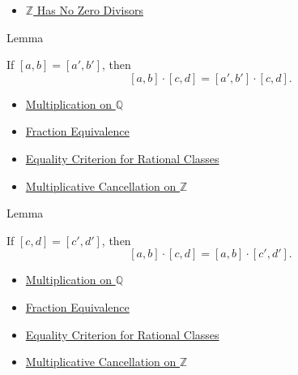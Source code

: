 \begin{dependencies}
\begin{itemize}
  \item \hyperref[thm:z-has-no-zero-divisors]{$\mathbb{Z}$ Has No Zero Divisors}
\end{itemize}
\end{dependencies}

\begin{lemmabox}{Lemma}
\begin{lemma}
\label{lem:multiplication-on-q-respects-left-equivalence}
If $[a,b]=[a',b']$, then
\[
[a,b]\cdot[c,d]=[a',b']\cdot[c,d].
\]
\end{lemma}
\end{lemmabox}

\begin{dependencies}
\begin{itemize}
  \item \hyperref[def:multiplication-on-q-classes]{Multiplication on $\mathbb{Q}$}
  \item \hyperref[def:fraction-equivalence]{Fraction Equivalence}
  \item \hyperref[prop:equality-criterion-for-rational-classes]{Equality Criterion for Rational Classes}
  \item \hyperref[cor:multiplicative-cancellation-on-z]{Multiplicative Cancellation on $\mathbb{Z}$}
\end{itemize}
\end{dependencies}

\begin{lemmabox}{Lemma}
\begin{lemma}
\label{lem:multiplication-on-q-respects-right-equivalence}
If $[c,d]=[c',d']$, then
\[
[a,b]\cdot[c,d]=[a,b]\cdot[c',d'].
\]
\end{lemma}
\end{lemmabox}

\begin{dependencies}
\begin{itemize}
  \item \hyperref[def:multiplication-on-q-classes]{Multiplication on $\mathbb{Q}$}
  \item \hyperref[def:fraction-equivalence]{Fraction Equivalence}
  \item \hyperref[prop:equality-criterion-for-rational-classes]{Equality Criterion for Rational Classes}
  \item \hyperref[cor:multiplicative-cancellation-on-z]{Multiplicative Cancellation on $\mathbb{Z}$}
\end{itemize}
\end{dependencies}

